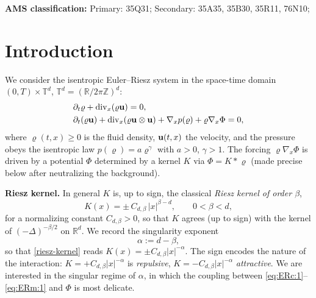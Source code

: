 \documentclass[12pt,a4paper,twoside]{article}
\newcommand{\Div}{\operatorname{div}}
\newcommand{\vr}{\varrho}
\newcommand{\vu}{\vc{u}}
\newcommand{\vc}[1]{{\bf #1}}
\newcommand{\Grad}{\nabla}
\numberwithin{equation}{section}%
\begin{document}
	{\bf AMS classification:} Primary: 35Q31; Secondary: 35A35, 35B30, 35R11, 76N10;
	
	\tableofcontents
	
	
	\section{Introduction}
	
We consider the isentropic Euler--Riesz system in the space-time domain
$(0,T)\times\mathbb T^d$, $\mathbb T^d=(\mathbb R/2\pi\mathbb Z)^d$: %
\begin{align}
	& \partial_t \vr + \Div_x( \vr \vu ) = 0, \label{eq:ERc:1}\\
	& \partial_t(\vr \vu) + \Div_x (\vr \vu \otimes \vu ) + \Grad_x p(\vr) + \vr \Grad_x \Phi = 0,\label{eq:ERm:1}
\end{align}
where $\vr(t,x)\ge0$ is the fluid density, $\vu(t,x)$ the velocity, and the pressure obeys
the isentropic law $p(\vr)=a\vr^\gamma$ with $a>0$, $\gamma>1$. The forcing $\vr\Grad_x\Phi$
is driven by a potential $\Phi$ determined by a kernel $K$ via $\Phi=K\ast\vr$ (made precise
below after neutralizing the background).

\medskip 

\noindent\textbf{Riesz kernel.}
In general $K$ is, up to sign, the classical \emph{Riesz kernel of order $\beta$},
\begin{equation}\label{riesz-kernel}
	K(x) = \pm\, C_{d,\beta}\, |x|^{\beta - d}, \qquad 0 < \beta < d,
\end{equation}
for a normalizing constant $C_{d,\beta}>0$, so that $K$ agrees (up to sign) with the kernel of
$(-\Delta)^{-\beta/2}$ on $\mathbb R^d$. We record the singularity exponent
\begin{equation}\label{alpha-beta}
	\alpha := d - \beta,
\end{equation}
so that \eqref{riesz-kernel} reads $K(x)=\pm C_{d,\beta}|x|^{-\alpha}$. The sign encodes the
nature of the interaction: $K=+C_{d,\beta}|x|^{-\alpha}$ is \emph{repulsive},
$K=-C_{d,\beta}|x|^{-\alpha}$ \emph{attractive}. We are interested in the singular regime of
$\alpha$, in which the coupling between \eqref{eq:ERc:1}--\eqref{eq:ERm:1} and $\Phi$ is most
delicate.
\end{document}
